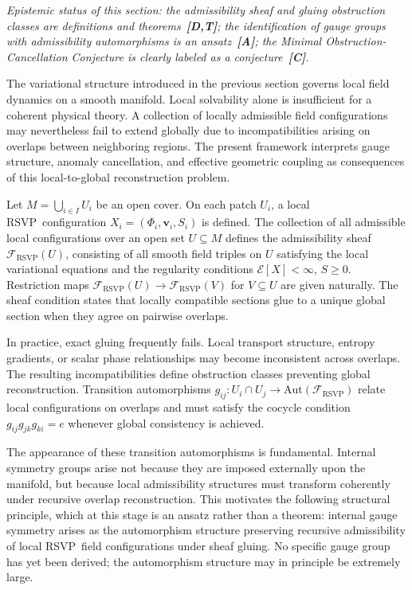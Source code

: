 \documentclass[12pt,a4paper]{article}
\newcommand{\RSVP}{\textrm{RSVP}}
\newcommand{\Sheaf}{\mathcal{F}}
\begin{document}
\emph{Epistemic status of this section: the admissibility sheaf and gluing
obstruction classes are definitions and theorems~\textbf{[D,T]}; the identification
of gauge groups with admissibility automorphisms is an ansatz~\textbf{[A]};
the Minimal Obstruction-Cancellation Conjecture is clearly labeled as
a conjecture~\textbf{[C]}.}

The variational structure introduced in the previous section governs local field
dynamics on a smooth manifold. Local solvability alone is insufficient for a
coherent physical theory. A collection of locally admissible field configurations
may nevertheless fail to extend globally due to incompatibilities arising on
overlaps between neighboring regions. The present framework interprets gauge
structure, anomaly cancellation, and effective geometric coupling as consequences
of this local-to-global reconstruction problem.

Let $M=\bigcup_{i\in I} U_i$ be an open cover. On each patch $U_i$, a local
\RSVP\ configuration $X_i=(\Phi_i,\mathbf{v}_i,S_i)$ is defined. The
collection of all admissible local configurations over an open set $U\subseteq M$
defines the admissibility sheaf $\Sheaf_\RSVP(U)$, consisting of all smooth
field triples on $U$ satisfying the local variational equations and the
regularity conditions $\mathcal{E}[X]<\infty$, $S\geq 0$. Restriction maps
$\Sheaf_\RSVP(U)\to\Sheaf_\RSVP(V)$ for $V\subseteq U$ are given naturally. The
sheaf condition states that locally compatible sections glue to a unique global
section when they agree on pairwise overlaps.

In practice, exact gluing frequently fails. Local transport structure, entropy
gradients, or scalar phase relationships may become inconsistent across overlaps.
The resulting incompatibilities define obstruction classes preventing global
reconstruction. Transition automorphisms $g_{ij}:U_i\cap U_j\to\mathrm{Aut}(\Sheaf_\RSVP)$
relate local configurations on overlaps and must satisfy the cocycle condition
$g_{ij}g_{jk}g_{ki}=e$ whenever global consistency is achieved.

The appearance of these transition automorphisms is fundamental. Internal
symmetry groups arise not because they are imposed externally upon the manifold,
but because local admissibility structures must transform coherently under
recursive overlap reconstruction. This motivates the following structural
principle, which at this stage is an ansatz rather than a theorem: internal
gauge symmetry arises as the automorphism structure preserving recursive
admissibility of local \RSVP\ field configurations under sheaf gluing. No
specific gauge group has yet been derived; the automorphism structure may in
principle be extremely large.
\end{document}
